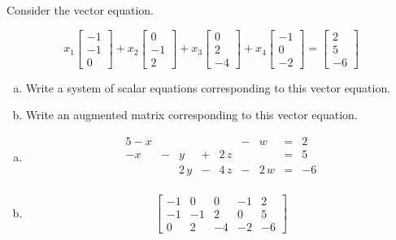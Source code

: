 
\begin{exerciseStatement}


Consider the vector equation.

\[ x_{1} \left[\begin{array}{c}
-1 \\
-1 \\
0
\end{array}\right] + x_{2} \left[\begin{array}{c}
0 \\
-1 \\
2
\end{array}\right] + x_{3} \left[\begin{array}{c}
0 \\
2 \\
-4
\end{array}\right] + x_{4} \left[\begin{array}{c}
-1 \\
0 \\
-2
\end{array}\right] = \left[\begin{array}{c}
2 \\
5 \\
-6
\end{array}\right] \]
\begin{enumerate}[(a)]
\item  Write a system of scalar equations corresponding to this vector equation. 
\item  Write an augmented matrix corresponding to this vector equation. 
\end{enumerate}
    
\end{exerciseStatement}
    
\begin{exerciseAnswer} 

\begin{enumerate}[(a)]
\item 
\begin{alignat*}{5} -x & &  & &  &-& {w} &=& 2 \\-x &-& y &+& 2 \, z & &  &=& 5 \\ & & 2 \, y &-& 4 \, z &-& 2 \, {w} &=& -6 \\ \end{alignat*}
            
\item \[ \left[\begin{array}{cccc|c}
-1 & 0 & 0 & -1 & 2 \\
-1 & -1 & 2 & 0 & 5 \\
0 & 2 & -4 & -2 & -6
\end{array}\right] \]
\end{enumerate}
    
\end{exerciseAnswer}
    
